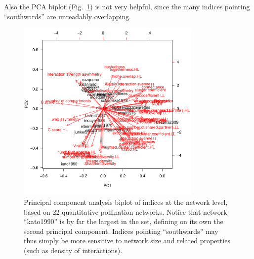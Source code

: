 \documentclass[a4paper, 11pt]{article}\usepackage[]{graphicx}\usepackage[]{color}
\begin{document}
Also the PCA biplot (Fig.~\ref{fig:PCAnetworklevel}) is not very helpful, since the many indices pointing ``southwards'' are unreadably overlapping.
%
\begin{figure}
\centering
\includegraphics[width=0.8\textwidth]{figures/PCAnetworklevel}
\caption{Principal component analysis biplot of indices at the network level, based on 22 quantitative pollination networks. Notice that network ``kato1990'' is by far the largest in the set, defining on its own the second principal component. Indices pointing ``southwards'' may thus simply be more sensitive to network size and related properties (such as density of interactions).}
\label{fig:PCAnetworklevel}
\end{figure}
\end{document}
